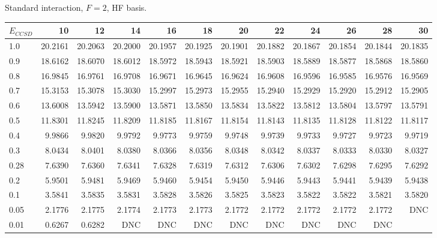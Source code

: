 \begin{landscape}
\begin{table}
\begin{center}
Standard interaction, $F=2$, HF basis.\\
\begin{tabular}{l|rrrrrrrrrrr}
\hline 
$E_{CCSD}$ & 10 & 12 & 14 & 16 & 18 & 20 & 22 & 24 & 26 & 28 & 30 \\
\hline \hline
1.0 & 20.2161 & 20.2063 & 20.2000 & 20.1957 & 20.1925 & 20.1901 & 20.1882 & 20.1867 & 20.1854 & 20.1844 & 20.1835 \\ 
0.9 & 18.6162 & 18.6070 & 18.6012 & 18.5972 & 18.5943 & 18.5921 & 18.5903 & 18.5889 & 18.5877 & 18.5868 & 18.5860 \\ 
0.8 & 16.9845 & 16.9761 & 16.9708 & 16.9671 & 16.9645 & 16.9624 & 16.9608 & 16.9596 & 16.9585 & 16.9576 & 16.9569 \\ 
0.7 & 15.3153 & 15.3078 & 15.3030 & 15.2997 & 15.2973 & 15.2955 & 15.2940 & 15.2929 & 15.2920 & 15.2912 & 15.2905 \\ 
0.6 & 13.6008 & 13.5942 & 13.5900 & 13.5871 & 13.5850 & 13.5834 & 13.5822 & 13.5812 & 13.5804 & 13.5797 & 13.5791 \\ 
0.5 & 11.8301 & 11.8245 & 11.8209 & 11.8185 & 11.8167 & 11.8154 & 11.8143 & 11.8135 & 11.8128 & 11.8122 & 11.8117 \\ 
0.4 & 9.9866 & 9.9820 & 9.9792 & 9.9773 & 9.9759 & 9.9748       &  9.9739 & 9.9733  &  9.9727 &  9.9723 &  9.9719 \\ 
0.3 & 8.0434 & 8.0401 & 8.0380 & 8.0366 & 8.0356 & 8.0348       &  8.0342 & 8.0337  &  8.0333 &  8.0330 &  8.0327 \\ 
0.28 & 7.6390 & 7.6360 & 7.6341 & 7.6328 & 7.6319 & 7.6312      &  7.6306 & 7.6302  &  7.6298 &  7.6295 &  7.6292 \\ 
0.2 & 5.9501 & 5.9481 & 5.9469 & 5.9460 & 5.9454 & 5.9450       &  5.9446 & 5.9443  &  5.9441 &  5.9439 &  5.9438 \\ 
0.1 & 3.5841 & 3.5835 & 3.5831 & 3.5828 & 3.5826 & 3.5825       &  3.5823 & 3.5822  &  3.5822 &  3.5821 &  3.5820 \\ 
0.05 & 2.1776 & 2.1775 & 2.1774 & 2.1773 & 2.1773 & 2.1772      &  2.1772 & 2.1772  &  2.1772 &  2.1772 &     DNC \\ 
0.01 & 0.6267 & 0.6282 & DNC & DNC & DNC & DNC                  &  DNC    & DNC     &  DNC    &     DNC & \\ 
\hline \hline
\end{tabular}
\end{center}
\end{table}
\end{landscape}

